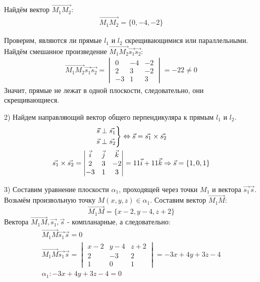 \begin{eg}
  Найдём вектор $\overrightarrow{M_1M_2}$:
  \begin{gather*}
    \overrightarrow{M_1M_2} = \{0, -4, -2\} 
  \end{gather*}

  Проверим, являются ли прямые $l_1$ и $l_2$ скрещивающимися или параллельными. Найдём смешанное произведение $\overrightarrow{M_1M_2} \vec{s_1} \vec{s_2}$:
  \begin{gather*}
    \overrightarrow{M_1M_2} \vec{s_1} \vec{s_2} = 
    \begin{vmatrix}
      0 & -4 & -2 \\
      2 & 3 & -2 \\
      -3 & 1 & 3
    \end{vmatrix} = -22 \neq 0
  \end{gather*}
  Значит, прямые не лежат в одной плоскости, следовательно, они скрещивающиеся.

  2) Найдем направляющий вектор общего перпендикуляра к прямым $l_1$ и $l_2$.
  \begin{gather*}
    \begin{rcases}
      \vec{s} \perp \vec{s_1} \\
      \vec{s} \perp \vec{s_2}
    \end{rcases}
    \iff \vec{s} = \vec{s_1} \times \vec{s_2} \\
    \vec{s_1} \times \vec{s_2} = 
    \begin{vmatrix}
      \vec{i} & \vec{j} & \vec{k} \\
      2 & 3 & -2 \\
      -3 & 1 & 3
    \end{vmatrix} = 11 \vec{i} + 11 \vec{k} \implies \vec{s} = \{1, 0, 1\} \\ 
  \end{gather*}

  3) Составим уравнение плоскости $\alpha_1$, проходящей через точки $M_1$ и вектора $\vec{s_1} \vec{s}$. 
  Возьмём произвольную точку $M(x, y, z) \in \alpha_1$.
  Составим вектор $\overrightarrow{M_1M}$: \[
  \overrightarrow{M_1M} = \{x - 2, y - 4, z + 2\} 
  \]
  Вектора $\overrightarrow{M_1M}, \vec{s_1}, \vec{s}$ - компланарные, а следовательно: 
  \begin{gather*}
    \overrightarrow{M_1M} \vec{s_1} \vec{s} = 0 \\
    \overrightarrow{M_1M} \vec{s_1} \vec{s} = 
    \begin{vmatrix}
      x - 2 & y - 4 & z + 2 \\
      2 & -3 & 2 \\
      1 & 0 & 1
    \end{vmatrix} = 
    -3x + 4y + 3z  - 4\\
    \boxed{\alpha_1: -3x + 4y + 3z - 4 = 0}
  \end{gather*}


\end{eg}
